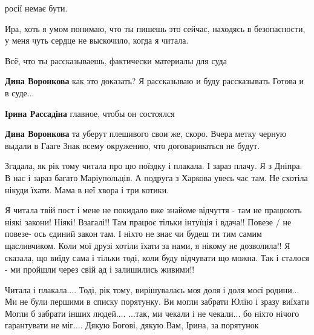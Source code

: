  
 
 
 
 

\qqSecCmt


росії немає бути.


Ира, хоть я умом понимаю, что ты пишешь это сейчас, находясь в безопасности, у
меня чуть сердце не выскочило, когда я читала.

Всё, что ты рассказываешь, фактически материалы для суда

\begin{itemize} %
\textbf{Дина Воронкова} как это доказать?
Я рассказываю и буду рассказывать
Готова и в суде...

\textbf{Ірина Рассадіна} главное, чтобы он состоялся

\textbf{Дина Воронкова} та уберут плешивого свои же, скоро.
Вчера метку черную выдали в Гааге
Знак всему окружению, что договариваться не будут.
\end{itemize} %


\obeycr
Згадала, як рік тому читала про цю поїздку і плакала.
І зараз плачу.
Я з Дніпра.
В нас і зараз багато Маріупольців.
А подруга з Харкова увесь час там.
Не схотіла нікуди їхати.
Мама в неї хвора і три котики.
\restorecr


Я читала твій пост і мене не покидало вже знайоме відчуття - там не працюють
ніякі закони! Ніякі! Взагалі!! Там працює тільки інтуїція і вдача!! Повезе / не
повезе- ось єдиний закон там. І ніхто не знає чи будеш ти тим самим
щасливчиком. Коли мої друзі хотіли їхати за нами, я нікому не дозволила!! Я
сказала, що виїду сама і тільки тоді, коли буду відчувати що можна. Так і сталося
- ми пройшли через свій ад і залишились живими!!


Читала і плакала....
Тоді, рік тому, вирішувалась моя доля і доля моєї родини...
Ми не були першими в списку порятунку.
Ви могли забрати Юлію і зразу виїхати
Могли б забрати інших людей....
...так, ми чекали і не чекали... бо ніхто нічого гарантувати не міг....
Дякую Богові, дякую Вам, Ірина, за порятунок 🙏🏾

